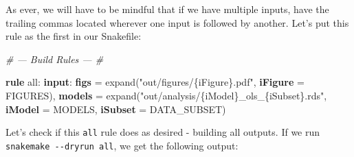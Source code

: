 \documentclass[]{book}
\newenvironment{Shaded}{\begin{snugshade}}{\end{snugshade}}
\newcommand{\KeywordTok}[1]{\textcolor[rgb]{0.13,0.29,0.53}{\textbf{{#1}}}}
\newcommand{\StringTok}[1]{\textcolor[rgb]{0.31,0.60,0.02}{{#1}}}
\newcommand{\CommentTok}[1]{\textcolor[rgb]{0.56,0.35,0.01}{\textit{{#1}}}}
\newcommand{\NormalTok}[1]{{#1}}
\theoremstyle{definition}
\theoremstyle{definition}
\theoremstyle{definition}
\theoremstyle{remark}
\begin{document}
As ever, we will have to be mindful that if we have multiple inputs,
have the trailing commas located wherever one input is followed by
another. Let's put this rule as the first in our Snakefile:

\begin{Shaded}
\begin{Highlighting}[]
\CommentTok{# --- Build Rules --- #}

\KeywordTok{rule} \NormalTok{all:}
    \KeywordTok{input}\NormalTok{:}
        \KeywordTok{figs}   \NormalTok{= expand(}\StringTok{"out/figures/\{iFigure\}.pdf"}\NormalTok{,}
                            \KeywordTok{iFigure} \NormalTok{= FIGURES),}
        \KeywordTok{models} \NormalTok{= expand(}\StringTok{"out/analysis/\{iModel\}_ols_\{iSubset\}.rds"}\NormalTok{,}
                            \KeywordTok{iModel} \NormalTok{= MODELS,}
                            \KeywordTok{iSubset} \NormalTok{= DATA_SUBSET)}
\end{Highlighting}
\end{Shaded}

Let's check if this \texttt{all} rule does as desired - building all
outputs. If we run \texttt{snakemake\ -\/-dryrun\ all}, we get the
following output:
\end{document}
